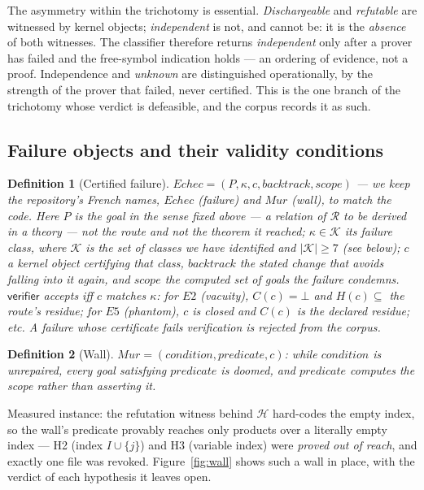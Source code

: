 \documentclass[11pt]{article}
\newtheorem{definition}{Definition}
\theoremstyle{remark}\newtheorem{example}{Example}
\begin{document}
The asymmetry within the trichotomy is essential.
\emph{Dischargeable} and \emph{refutable} are witnessed by kernel objects;
\emph{independent} is not, and cannot be: it is the \emph{absence} of both witnesses.
The classifier therefore returns \emph{independent} only after a prover has failed
and the free-symbol indication holds --- an ordering of evidence, not a proof.
Independence and \emph{unknown} are distinguished operationally, by the strength of
the prover that failed, never certified. This is the one branch of the trichotomy
whose verdict is defeasible, and the corpus records it as such.

\subsection{Failure objects and their validity conditions}
\begin{definition}[Certified failure]
$\mathit{Echec} = (P, \kappa, c, \mathit{backtrack}, \mathit{scope})$ --- we keep the
repository's French names, $\mathit{Echec}$ (failure) and $\mathit{Mur}$ (wall), to
match the code. Here $P$ is the \emph{goal} in the sense fixed above --- a relation of
$\mathcal{R}$ to be derived in a theory --- not the route and not the theorem it
reached; $\kappa \in \mathcal{K}$ its failure class, where $\mathcal{K}$ is the set of
classes we have \emph{identified} and $|\mathcal{K}| \ge 7$ (see below); $c$ a kernel
object certifying that class,
$\mathit{backtrack}$ the stated change that avoids falling into it again, and
$\mathit{scope}$ the \emph{computed} set of goals the failure condemns. $\mathsf{verifier}$ accepts
iff $c$ matches $\kappa$: for $E2$ (vacuity), $C(c) = \bot$ and $H(c) \subseteq$ the
route's residue; for $E5$ (phantom), $c$ is closed and $C(c)$ \emph{is} the declared
residue; etc. A failure whose certificate fails verification is \emph{rejected from the
corpus}.
\end{definition}

\begin{definition}[Wall] $\mathit{Mur} = (\mathit{condition}, \mathit{predicate}, c)$:
while $\mathit{condition}$ is unrepaired, every goal satisfying $\mathit{predicate}$ is
doomed, and $\mathit{predicate}$ \emph{computes} the scope rather than asserting it.
\end{definition}
Measured instance: the refutation witness behind $\mathcal{H}$ hard-codes the empty
index, so the wall's predicate provably reaches only products over a literally empty
index --- H2 (index $I \cup \{j\}$) and H3 (variable index) were \emph{proved out of
reach}, and exactly one file was revoked. Figure~\ref{fig:wall} shows such a wall
in place, with the verdict of each hypothesis it leaves open.
\end{document}
